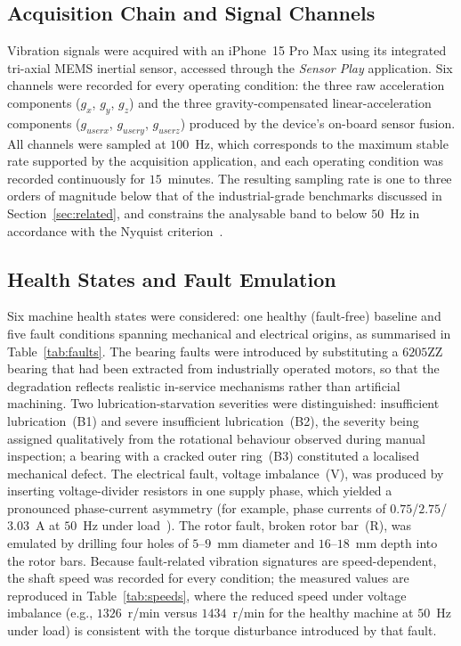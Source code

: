 \subsection{Acquisition Chain and Signal Channels}
Vibration signals were acquired with an iPhone~15 Pro Max using its integrated
tri-axial MEMS inertial sensor, accessed through the \textit{Sensor Play}
application. Six channels were recorded for every operating condition: the three
raw acceleration components ($g_x$, $g_y$, $g_z$) and the three
gravity-compensated linear-acceleration components ($g_{userx}$, $g_{usery}$,
$g_{userz}$) produced by the device's on-board sensor fusion. All channels were
sampled at $100$~Hz, which corresponds to the maximum stable rate supported by
the acquisition application, and each operating condition was recorded
continuously for $15$~minutes. The resulting sampling rate is one to three
orders of magnitude below that of the industrial-grade benchmarks discussed in
Section~\ref{sec:related}, and constrains the analysable band to below
$50$~Hz in accordance with the Nyquist criterion~\cite{nyquist1924certain,
shannon1948mathematical}.

\subsection{Health States and Fault Emulation}
Six machine health states were considered: one healthy (fault-free) baseline and
five fault conditions spanning mechanical and electrical origins, as summarised
in Table~\ref{tab:faults}. The bearing faults were introduced by substituting a
$6205$ZZ bearing that had been extracted from industrially operated motors, so
that the degradation reflects realistic in-service mechanisms rather than
artificial machining. Two lubrication-starvation severities were distinguished:
insufficient lubrication~(B1) and severe insufficient lubrication~(B2), the
severity being assigned qualitatively from the rotational behaviour observed
during manual inspection; a bearing with a cracked outer ring~(B3) constituted a
localised mechanical defect. The electrical fault, voltage imbalance~(V), was
produced by inserting voltage-divider resistors in one supply phase, which
yielded a pronounced phase-current asymmetry (for example, phase currents of
$0.75$/$2.75$/$3.03$~A at $50$~Hz under load~\cite{ertargin2026smartphone}). The
rotor fault, broken rotor bar~(R), was emulated by drilling four holes of
$5$--$9$~mm diameter and $16$--$18$~mm depth into the rotor bars. Because
fault-related vibration signatures are speed-dependent, the shaft speed was
recorded for every condition; the measured values are reproduced in
Table~\ref{tab:speeds}, where the reduced speed under voltage imbalance
(e.g., $1326$~r/min versus $1434$~r/min for the healthy machine at $50$~Hz under
load) is consistent with the torque disturbance introduced by that fault.

